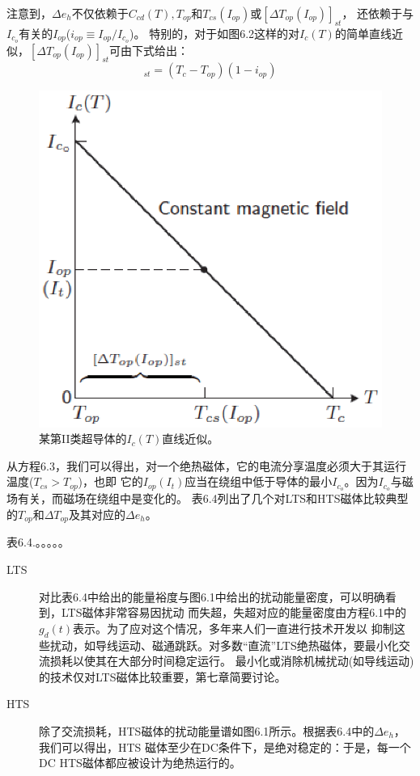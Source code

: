 注意到，$\Delta e_h$不仅依赖于$C_{cd}(T),T_{op}$和$T_{cs}(I_{op})$或$[\Delta T_{op}(I_{op})]_{st}$，
还依赖于与$I_{c_o}$有关的$I_{op}$($i_{op}\equiv I_{op}/I_{c_o}$)。
特别的，对于如图6.2这样的对$I_c(T)$的简单直线近似，$[\Delta T_{op}(I_{op})]_{st}$可由下式给出：
\begin{equation}%
[\Delta T_{op}(I_{op})]_{st}=(T_c-T_{op})(1-i_{op})
\end{equation}
\begin{figure}[htbp]
	\centering
	\includegraphics[scale=0.7]{chpt6/figs/fig6.2.eps}
	\caption{某第II类超导体的$I_c(T)$直线近似。}
\end{figure}

从方程6.3，我们可以得出，对一个绝热磁体，它的电流分享温度必须大于其运行温度($T_{cs}>T_{op}$)，也即
它的$I_{op}(I_t)$应当在绕组中低于导体的最小$I_{c_o}$。因为$I_{c_o}$与磁场有关，而磁场在绕组中是变化的。
表6.4列出了几个对LTS和HTS磁体比较典型的$T_{op}$和$\Delta T_{op}$及其对应的$\Delta e_h$。

表6.4.。。。。。

\begin{description}
	\item[LTS] 对比表6.4中给出的能量裕度与图6.1中给出的扰动能量密度，可以明确看到，LTS磁体非常容易因扰动
	而失超，失超对应的能量密度由方程6.1中的$g_d(t)$表示。为了应对这个情况，多年来人们一直进行技术开发以
	抑制这些扰动，如导线运动、磁通跳跃。对多数“直流”LTS绝热磁体，要最小化交流损耗以使其在大部分时间稳定运行。
	最小化或消除机械扰动(如导线运动)的技术仅对LTS磁体比较重要，第七章简要讨论。
	\item[HTS] 除了交流损耗，HTS磁体的扰动能量谱如图6.1所示。根据表6.4中的$\Delta e_h$，我们可以得出，HTS
	磁体至少在DC条件下，是绝对稳定的：于是，每一个DC HTS磁体都应被设计为绝热运行的。
\end{description}

